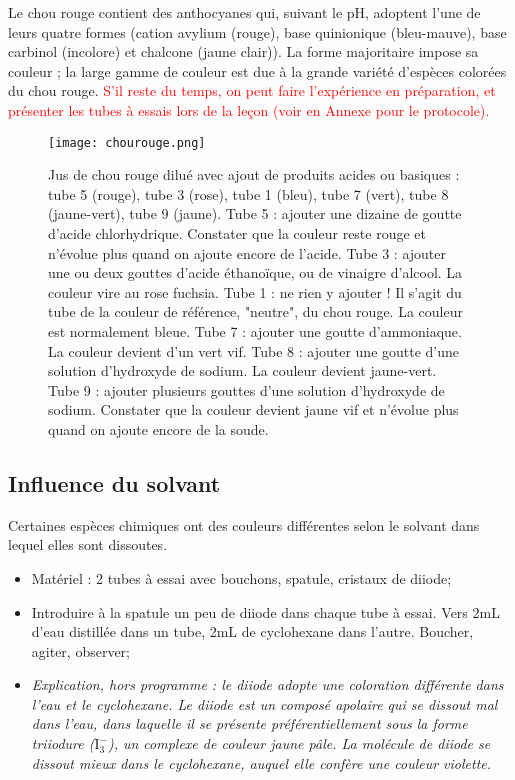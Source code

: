 \documentclass[11pt,a4paper]{report}
\begin{document}
Le chou rouge contient des anthocyanes qui, suivant le pH, adoptent l'une de leurs quatre formes (cation avylium (rouge), base quinionique (bleu-mauve), base carbinol (incolore) et chalcone (jaune clair)). La forme majoritaire impose sa couleur ; la large gamme de couleur est due à la grande variété d'espèces colorées du chou rouge. \textcolor{red}{S'il reste du temps, on peut faire l'expérience en préparation, et présenter les tubes à essais lors de la leçon (voir en Annexe pour le protocole).}

\begin{figure}[h!]
	\begin{center}
  		\texttt{[image: chourouge.png]}
	\caption{Jus de chou rouge dilué avec ajout de produits acides ou basiques : tube 5 (rouge), tube 3 	(rose), tube 1 (bleu), tube 7 (vert), tube 8 (jaune-vert), tube 9 (jaune). Tube 5 : ajouter une 		dizaine de goutte d'acide chlorhydrique. Constater que la couleur reste rouge et n'évolue plus 			quand on ajoute encore de l'acide. Tube 3 : ajouter une ou deux gouttes d'acide éthanoïque, ou de 		vinaigre d'alcool. La couleur vire au rose fuchsia. Tube 1 : ne rien y ajouter ! Il s'agit du tube 		de la couleur de référence, "neutre", du chou rouge. La couleur est normalement bleue. Tube 7 : 		ajouter une goutte d'ammoniaque. La couleur devient d'un vert vif. Tube 8 : ajouter une goutte 			d'une solution d'hydroxyde de sodium. La couleur devient jaune-vert. Tube 9 : ajouter plusieurs 		gouttes d'une solution d'hydroxyde de sodium. Constater que la couleur devient jaune vif et 			n'évolue plus quand on ajoute encore de la soude.}
	\end{center}
\end{figure}

\subsection{Influence du solvant}

Certaines espèces chimiques ont des couleurs différentes selon le solvant dans lequel elles sont dissoutes.

\begin{itemize}
	\item Matériel : 2 tubes à essai avec bouchons, spatule, cristaux de diiode;	
	\item Introduire à la spatule un peu de diiode dans chaque tube à essai. Vers 2mL d'eau distillée 			dans un tube, 2mL de cyclohexane dans l'autre. Boucher, agiter, observer;
	\item  \textit{Explication, hors programme : le diiode adopte une coloration différente dans l'eau 			et le cyclohexane. Le diiode est un composé apolaire qui se dissout mal dans l'eau, dans 				laquelle il se présente préférentiellement sous la forme triiodure ($\text{I}_3^-$), un 				complexe de couleur jaune pâle. La molécule de diiode se dissout mieux dans le cyclohexane, 			auquel elle confère une couleur violette.}
\end{itemize}
\end{document}
